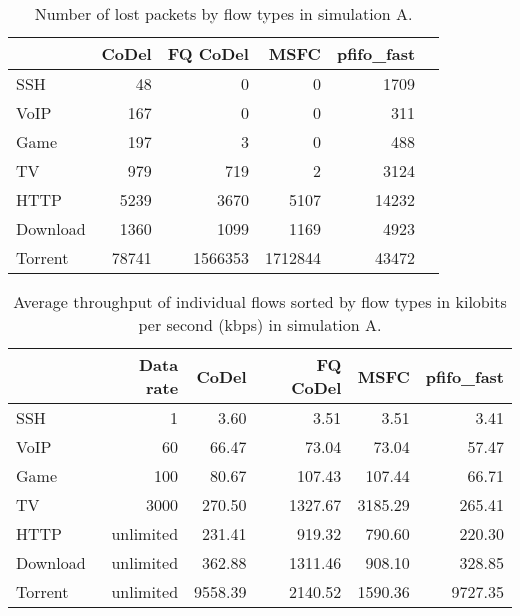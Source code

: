 \begin{table}
	\centering
	
	\begin{tabular}{@{}l|rrrrr@{}}
		\toprule
		& {CoDel} & {FQ CoDel} & {MSFC} & {pfifo\_fast}  \\ \midrule
		SSH       &    48         &    0          &    0          &    1709  \\
		VoIP      &    167        &    0          &    0          &    311   \\
		Game      &    197        &    3          &    0          &    488   \\
		TV        &    979        &    719        &    2          &    3124  \\
		HTTP      &    5239       &    3670       &    5107       &    14232 \\
		Download  &    1360       &    1099       &    1169       &    4923  \\
		Torrent   &    78741      &    1566353    &    1712844    &    43472 \\ \bottomrule
	\end{tabular}
	\caption{Number of lost packets by flow types in simulation A.}
	\label{tab:loss_A}
\end{table}

\begin{table}
	\centering
	
	\begin{tabular}{@{}l|rrrrr@{}}
		\toprule
		         & {Data rate} & {CoDel} & {FQ CoDel} &  {MSFC} & {pfifo\_fast} \\ \midrule
		SSH      &           1 &    3.60 &       3.51 &    3.51 &          3.41 \\
		VoIP     &          60 &   66.47 &      73.04 &   73.04 &         57.47 \\
		Game     &         100 &   80.67 &     107.43 &  107.44 &         66.71 \\
		TV       &        3000 &  270.50 &    1327.67 & 3185.29 &        265.41 \\
		HTTP     &   unlimited &  231.41 &     919.32 &  790.60 &        220.30 \\
		Download &   unlimited &  362.88 &    1311.46 &  908.10 &        328.85 \\
		Torrent  &   unlimited & 9558.39 &    2140.52 & 1590.36 &       9727.35 \\ \bottomrule
	\end{tabular}
	\caption{Average throughput of individual flows sorted by flow types in kilobits per second (kbps)  in simulation A.}
	\label{tab:throughput_A}
\end{table}









